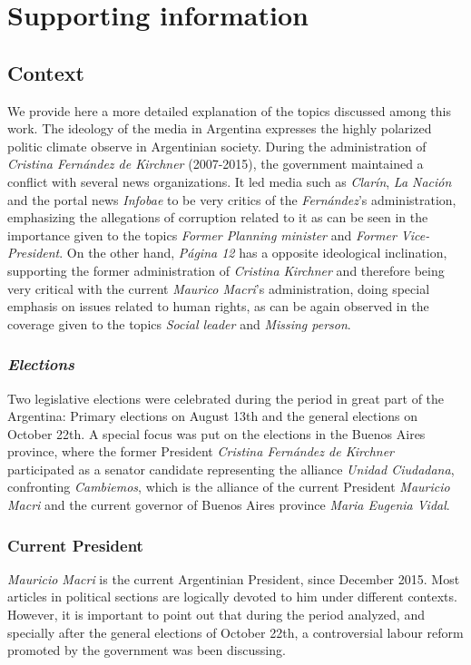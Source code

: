 \documentclass[10pt,letterpaper]{article}
\begin{document}
\section*{Supporting information}

\subsection*{Context}
\label{sec:Context}

\par We provide here a more detailed explanation of the topics discussed among this work.
The ideology of the media in Argentina expresses the highly polarized politic climate observe in Argentinian society.
During the administration of \emph{Cristina Fern\'andez de Kirchner} (2007-2015), the government maintained a conflict with several news organizations.
It led media such as \emph{Clar\'in}, \emph{La Naci\'on} and the portal news \emph{Infobae} to be very critics of the \emph{Fern\'andez}'s administration, emphasizing the allegations of corruption related to it as can be seen in the importance given to the topics \emph{Former Planning minister} and \emph{Former Vice-President}.
On the other hand, \emph{P\'agina 12} has a opposite ideological inclination, supporting the former administration of \emph{Cristina Kirchner} and therefore being very critical with the current \emph{Maurico Macri}'s administration, doing special emphasis on issues related to human rights, as can be again observed in the coverage given to the topics \emph{Social leader} and \emph{Missing person}.

\subsubsection*{\emph{Elections}}
\par Two legislative elections were celebrated during the period in great part of the Argentina: Primary elections on August 13th and the general elections on October 22th. 
A special focus was put on the elections in the Buenos Aires province, where the former President \emph{Cristina Fern\'andez de Kirchner} participated as a senator candidate representing the alliance \emph{Unidad Ciudadana}, confronting \emph{Cambiemos}, which is the alliance of the current President \emph{Mauricio Macri} and the current governor of Buenos Aires province \emph{Maria Eugenia Vidal}.
 
\subsubsection*{Current President}
\par \emph{Mauricio Macri} is the current Argentinian President, since December 2015. 
Most articles in political sections are logically devoted to him under different contexts.
However, it is important to point out that during the period analyzed, and specially after the general elections of October 22th, a controversial labour reform promoted by the government was been discussing.
\end{document}

